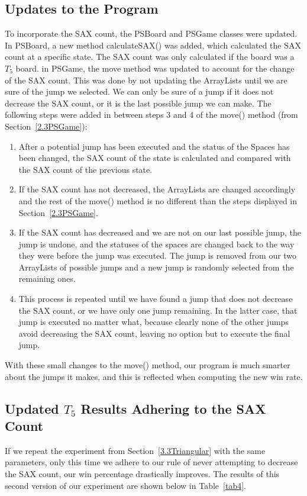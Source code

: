 \documentclass{article}
\begin{document}
\subsection{Updates to the Program}
\label{4.1ProgramUpdates}
To incorporate the SAX count, the PSBoard and PSGame classes were updated. In PSBoard, a new method calculateSAX() was added, which calculated the SAX count at a specific state. The SAX count was only calculated if the board was a $T_5$ board. in PSGame, the move method was updated to account for the change of the SAX count. This was done by not updating the ArrayLists until we are sure of the jump we selected. We can only be sure of a jump if it does not decrease the SAX count, or it is the last possible jump we can make. The following steps were added in between steps 3 and 4 of the move() method (from Section~\ref{2.3PSGame}):
\begin{enumerate}

\item After a potential jump has been executed and the status of the Spaces has been changed, the SAX count of the state is calculated and compared with the SAX count of the previous state.
\item If the SAX count has not decreased, the ArrayLists are changed accordingly and the rest of the move() method is no different than the steps displayed in Section~\ref{2.3PSGame}.
\item If the SAX count has decreased and we are not on our last possible jump, the jump is undone, and the statuses of the spaces are changed back to the way they were before the jump was executed. The jump is removed from our two ArrayLists of possible jumps and a new jump is randomly selected from the remaining ones.
\item This process is repeated until we have found a jump that does not decrease the SAX count, or we have only one jump remaining. In the latter case, that jump is executed no matter what, because clearly none of the other jumps avoid decreasing the SAX count, leaving no option but to execute the final jump.
\end{enumerate}

With these small changes to the move() method, our program is much smarter about the jumps it makes, and this is reflected when computing the new win rate.

\subsection{Updated $T_5$ Results Adhering to the SAX Count}
\label{4.2UpatedResults}
If we repeat the experiment from Section~\ref{3.3Triangular} with the same parameters, only this time we adhere to our rule of never attempting to decrease the SAX count, our win percentage drastically improves. The results of this second version of our experiment are shown below in Table~\ref{tab4}.
\end{document}

